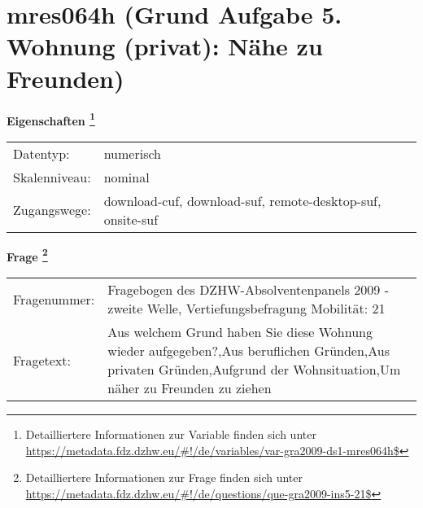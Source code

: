 
    \setcounter{footnote}{0}

    \vspace*{-1.8cm}
	\section{mres064h (Grund Aufgabe 5. Wohnung (privat): Nähe zu Freunden)}
	\label{section:mres064h}



    \vspace*{0.5cm}
    \noindent\textbf{Eigenschaften
	\footnote{Detailliertere Informationen zur Variable finden sich unter
		\url{https://metadata.fdz.dzhw.eu/\#!/de/variables/var-gra2009-ds1-mres064h$}}}\\
	\begin{tabularx}{\hsize}{@{}lX}
	Datentyp: & numerisch \\
	Skalenniveau: & nominal \\
	Zugangswege: &
	  download-cuf, 
	  download-suf, 
	  remote-desktop-suf, 
	  onsite-suf
 \\
    \end{tabularx}



				\vspace*{0.5cm}
                \noindent\textbf{Frage
	                \footnote{Detailliertere Informationen zur Frage finden sich unter
		              \url{https://metadata.fdz.dzhw.eu/\#!/de/questions/que-gra2009-ins5-21$}}}\\
				\begin{tabularx}{\hsize}{@{}lX}
					Fragenummer: &
					  Fragebogen des DZHW-Absolventenpanels 2009 - zweite Welle, Vertiefungsbefragung Mobilität:
					  21
 \\
					Fragetext: & Aus welchem Grund haben Sie diese Wohnung wieder aufgegeben?,Aus beruflichen Gründen,Aus privaten Gründen,Aufgrund der Wohnsituation,Um näher zu Freunden zu ziehen \\
				\end{tabularx}






